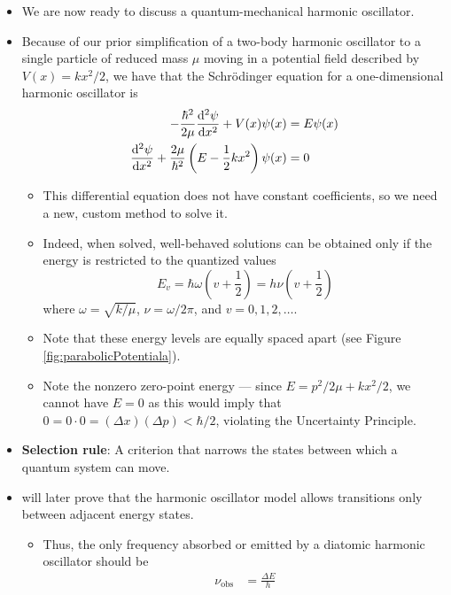 \documentclass[../notes.tex]{subfiles}
\begin{document}
\begin{itemize}
    \item We are now ready to discuss a quantum-mechanical harmonic oscillator.
    \item Because of our prior simplification of a two-body harmonic oscillator to a single particle of reduced mass $\mu$ moving in a potential field described by $V(x)=kx^2/2$, we have that the Schr\"{o}dinger equation for a one-dimensional harmonic oscillator is
    \begin{align*}
        -\frac{\hbar^2}{2\mu}\dv[2]{\psi}{x}+V(x)\psi(x) &= E\psi(x)\\
        \dv[2]{\psi}{x}+\frac{2\mu}{\hbar^2}\left( E-\frac{1}{2}kx^2 \right)\psi(x) &= 0
    \end{align*}
    \begin{itemize}
        \item This differential equation does not have constant coefficients, so we need a new, custom method to solve it.
        \item Indeed, when solved, well-behaved solutions can be obtained only if the energy is restricted to the quantized values
        \begin{equation*}
            E_v = \hbar\omega\left( v+\frac{1}{2} \right)
            = h\nu\left( v+\frac{1}{2} \right)
        \end{equation*}
        where $\omega=\sqrt{k/\mu}$, $\nu=\omega/2\pi$, and $v=0,1,2,\dots$.
        \item Note that these energy levels are equally spaced apart (see Figure \ref{fig:parabolicPotentiala}).
        \item Note the nonzero zero-point energy --- since $E=p^2/2\mu+kx^2/2$, we cannot have $E=0$ as this would imply that $0=0\cdot 0=(\Delta x)(\Delta p)<\hbar/2$, violating the Uncertainty Principle.
    \end{itemize}
    \item \textbf{Selection rule}: A criterion that narrows the states between which a quantum system can move.
    \item \textcite{bib:McQuarrieSimon} will later prove that the harmonic oscillator model allows transitions only between adjacent energy states.
    \begin{itemize}
        \item Thus, the only frequency absorbed or emitted by a diatomic harmonic oscillator should be
        \begin{align*}
            \nu_\text{obs} &= \frac{\Delta E}{h}\\

\end{align*}
\end{itemize}
\end{itemize}
\end{document}
